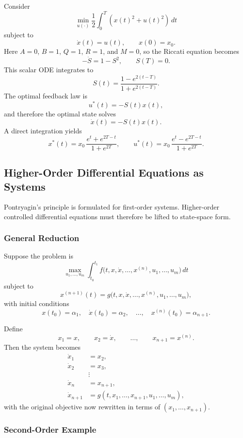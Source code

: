 \documentclass[11pt]{article}
\theoremstyle{definition}
\begin{document}
Consider
\[
\min_{u(\cdot)} \frac{1}{2}\int_0^T \left(x(t)^2+u(t)^2\right)\,dt
\]
subject to
\[
\dot{x}(t)=u(t), \qquad x(0)=x_0.
\]
Here $A=0$, $B=1$, $Q=1$, $R=1$, and $M=0$, so the Riccati equation becomes
\[
-\dot{S}=1-S^2,\qquad S(T)=0.
\]
This scalar ODE integrates to
\[
S(t)=\frac{1-e^{2(t-T)}}{1+e^{2(t-T)}}.
\]
The optimal feedback law is
\[
u^*(t)=-S(t)x(t),
\]
and therefore the optimal state solves
\[
\dot{x}(t)=-S(t)x(t).
\]
A direct integration yields
\[
x^*(t)=x_0\,\frac{e^t+e^{2T-t}}{1+e^{2T}},
\qquad
u^*(t)=x_0\,\frac{e^t-e^{2T-t}}{1+e^{2T}}.
\]

\subsection{Higher-Order Differential Equations as Systems}

Pontryagin’s principle is formulated for first-order systems. Higher-order controlled differential equations must therefore be lifted to state-space form.

\subsubsection{General Reduction}

Suppose the problem is
\[
\max_{u_1,\dots,u_m} \int_{t_0}^{t_1}
f\bigl(t,x,\dot{x},\dots,x^{(n)},u_1,\dots,u_m\bigr)\,dt
\]
subject to
\[
x^{(n+1)}(t)=g\bigl(t,x,\dot{x},\dots,x^{(n)},u_1,\dots,u_m\bigr),
\]
with initial conditions
\[
x(t_0)=\alpha_1,\quad \dot{x}(t_0)=\alpha_2,\quad \dots,\quad x^{(n)}(t_0)=\alpha_{n+1}.
\]

Define
\[
x_1=x,\qquad x_2=\dot{x},\qquad \dots,\qquad x_{n+1}=x^{(n)}.
\]
Then the system becomes
\begin{align}
\dot{x}_1 &= x_2,\\
\dot{x}_2 &= x_3,\\
&\vdots \\
\dot{x}_n &= x_{n+1},\\
\dot{x}_{n+1} &= g(t,x_1,\dots,x_{n+1},u_1,\dots,u_m),
\end{align}
with the original objective now rewritten in terms of $(x_1,\dots,x_{n+1})$.

\subsubsection{Second-Order Example}
\end{document}
